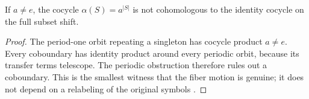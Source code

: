 \begin{proposition}
\label{prop:not-coboundary}
If \(a\ne e\), the cocycle \(\alpha(S)=a^{|S|}\) is not cohomologous to the
identity cocycle on the full subset shift.
\end{proposition}

\begin{proof}
The period-one orbit repeating a singleton has cocycle product \(a\ne e\).
Every coboundary has identity product around every periodic orbit, because
its transfer terms telescope.  The periodic obstruction therefore rules out
a coboundary.  This is the smallest witness that the fiber motion is genuine;
it does not depend on a relabeling of the original symbols
\citep{Livsic1972,ParryPollicott1997,Kalinin2011}.
\end{proof}

